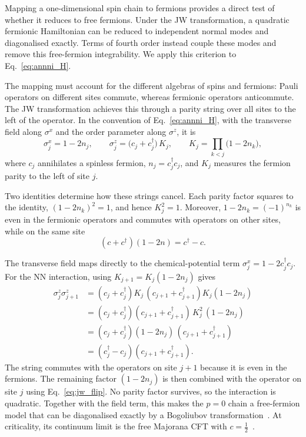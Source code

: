 Mapping a one-dimensional spin chain to fermions provides a direct test of whether it reduces to free fermions. Under the \ac{JW} transformation, a quadratic fermionic Hamiltonian can be reduced to independent normal modes and diagonalised exactly. Terms of fourth order instead couple these modes and remove this free-fermion integrability. We apply this criterion to Eq.~\eqref{eq:annni_H}.

The mapping must account for the different algebras of spins and fermions: Pauli operators on different sites commute, whereas fermionic operators anticommute. The \ac{JW} transformation achieves this through a parity string over all sites to the left of the operator. In the convention of Eq.~\eqref{eq:annni_H}, with the transverse field along $\sigma^x$ and the order parameter along $\sigma^z$, it is~\cite{jordan_wigner1928,fradkin2013}
\begin{equation}
  \sigma^x_j = 1 - 2n_j, \qquad
  \sigma^z_j = \big(c_j + c_j^\dagger\big)\,K_j, \qquad
  K_j = \prod_{k<j}\big(1-2n_k\big),
  \label{eq:annni:jwmap}
\end{equation}
where $c_j$ annihilates a spinless fermion, $n_j=c^\dagger_j c_j$, and $K_j$ measures the fermion parity to the left of site $j$.

Two identities determine how these strings cancel. Each parity factor squares to the identity, $(1-2n_k)^2=1$, and hence $K_j^2=1$. Moreover, $1-2n_k=(-1)^{n_k}$ is even in the fermionic operators and commutes with operators on other sites, while on the same site
\begin{equation}
  (c+c^{\dagger})(1-2n) = c^{\dagger}-c .
  \label{eq:jw_flip}
\end{equation}

The transverse field maps directly to the chemical-potential term $\sigma^x_j=1-2c^\dagger_jc_j$. For the \ac{NN} interaction, using $K_{j+1}=K_j(1-2n_j)$ gives
\begin{align}
  \sigma^z_j\sigma^z_{j+1}
   & = (c_j+c_j^{\dagger})K_j\,(c_{j+1}+c_{j+1}^{\dagger})K_j(1-2n_j) \nonumber  \\
   & = (c_j+c_j^{\dagger})(c_{j+1}+c_{j+1}^{\dagger})\,K_j^2\,(1-2n_j) \nonumber \\
   & = (c_j+c_j^{\dagger})(1-2n_j)\,(c_{j+1}+c_{j+1}^{\dagger}) \nonumber        \\
   & = (c_j^{\dagger}-c_j)(c_{j+1}+c_{j+1}^{\dagger}).
  \label{eq:jw_zz}
\end{align}
The string commutes with the operators on site $j+1$ because it is even in the fermions. The remaining factor $(1-2n_j)$ is then combined with the operator on site $j$ using Eq.~\eqref{eq:jw_flip}. No parity factor survives, so the interaction is quadratic. Together with the field term, this makes the $p=0$ chain a free-fermion model that can be diagonalised exactly by a Bogoliubov transformation~\cite{pfeuty1970}. At criticality, its continuum limit is the free Majorana \ac{CFT} with $c=\tfrac12$~\cite{difrancesco1997}.

